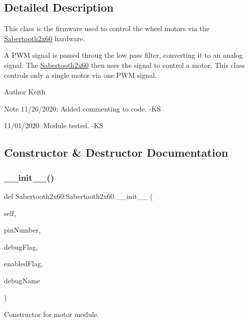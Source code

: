 \subsection{Detailed Description}
This class is the firmware used to control the wheel motors via the \hyperlink{classSabertooth2x60_1_1Sabertooth2x60}{Sabertooth2x60} hardware. 

A P\+WM signal is passed throug the low pass filter, converting it to an analog signal. The \hyperlink{classSabertooth2x60_1_1Sabertooth2x60}{Sabertooth2x60} then uses the signal to control a motor. This class controls only a single motor via one P\+WM signal. \begin{DoxyAuthor}{Author}
Keith 
\end{DoxyAuthor}
\begin{DoxyNote}{Note}
11/26/2020\+: Added commenting to code. -\/\+KS 

11/01/2020\+: Module tested. -\/\+KS 
\end{DoxyNote}


\subsection{Constructor \& Destructor Documentation}
\mbox{\label{classSabertooth2x60_1_1Sabertooth2x60_aba7178a08652239a3a9e5e84208402cd}} 
\subsubsection{\texorpdfstring{\+\_\+\+\_\+init\+\_\+\+\_\+()}{\_\_init\_\_()}}
{\footnotesize\ttfamily def Sabertooth2x60.\+Sabertooth2x60.\+\_\+\+\_\+init\+\_\+\+\_\+ (\begin{DoxyParamCaption}\item[{}]{self,  }\item[{}]{pin\+Number,  }\item[{}]{debug\+Flag,  }\item[{}]{enabled\+Flag,  }\item[{}]{debug\+Name }\end{DoxyParamCaption})}



Constructor for motor module. 

